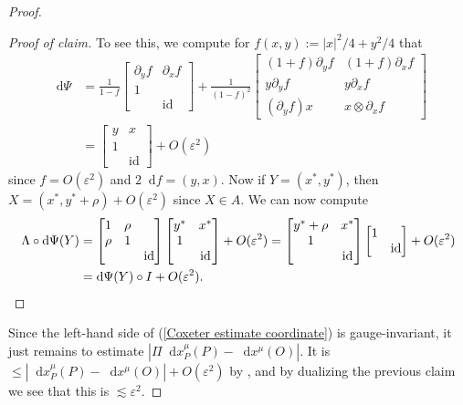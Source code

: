 \documentclass[reqno,10pt]{amsart}
\DeclareMathOperator{\id}{id}
\newcommand*\dif{\mathop{}\!\mathrm{d}}
\theoremstyle{definition}
\numberwithin{equation}{section}
\begin{document}
\begin{proof}
\begin{proof}[Proof of claim]
To see this, we compute for $f(x, y) := |x|^2/4 + y^2/4$ that
\begin{align*}
\dif \Psi &= \frac{1}{1 - f} \begin{bmatrix} \partial_y f & \partial_x f \\ 1 \\ & \id \end{bmatrix} + \frac{1}{(1 - f)^2} \begin{bmatrix}(1 + f) \partial_y f & (1 + f) \partial_x f \\
y \partial_y f & y \partial_x f \\
(\partial_y f) x & x \otimes \partial_x f
\end{bmatrix} \\
&= \begin{bmatrix}y & x \\ 1 \\ & \id \end{bmatrix} + O(\varepsilon^2)
\end{align*}
since $f = O(\varepsilon^2)$ and $2\dif f = (y, x)$. Now if $Y = (x^*, y^*)$, then $X = (x^*, y^* + \rho) + O(\varepsilon^2)$ \cite[(4.5.5)]{ratcliffe2006foundations} since $X \in A$.
We can now compute 
\begin{align*}
\Lambda \circ \dif \Psi(Y) &= \begin{bmatrix}1 & \rho \\ \rho & 1 \\ && \id \end{bmatrix} \begin{bmatrix}y^* & x^* \\ 1 \\ & \id \end{bmatrix} + O(\varepsilon^2) = \begin{bmatrix}y^* + \rho & x^* \\ 1 \\ & \id\end{bmatrix} \begin{bmatrix}1 \\ & \id\end{bmatrix} + O(\varepsilon^2) \\
&= \dif \Psi(Y) \circ I + O(\varepsilon^2). \qedhere
\end{align*}
\end{proof}

Since the left-hand side of (\ref{Coxeter estimate coordinate}) is gauge-invariant, it just remains to estimate $|\Pi \dif x^\mu_P(P) - \dif x^\mu(O)|$.
It is $\leq |\dif x^\mu_P(P) - \dif x^\mu(O)| + O(\varepsilon^2)$ by \cite[Lemma 4.2]{daskalopoulosPrep1}, and by dualizing the previous claim we see that this is $\lesssim \varepsilon^2$.
\end{proof}
\end{document}
